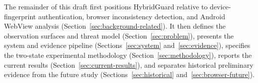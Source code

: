 The remainder of this draft first positions HybridGuard relative to device-fingerprint authentication, browser inconsistency detection, and Android WebView analysis (Section~\ref{sec:background-related}). It then defines the observation surfaces and threat model (Section~\ref{sec:problem}), presents the system and evidence pipeline (Sections~\ref{sec:system} and~\ref{sec:evidence}), specifies the two-state experimental methodology (Section~\ref{sec:methodology}), reports the current \appfp results (Section~\ref{sec:current-results}), and separates historical preliminary evidence from the future \browserfp study (Sections~\ref{sec:historical} and~\ref{sec:browser-future}).
